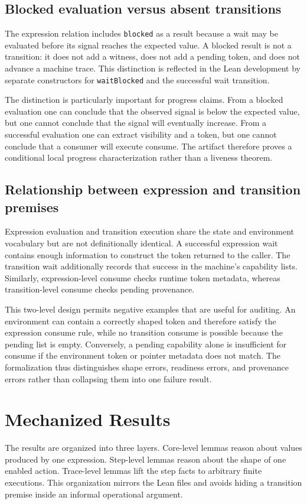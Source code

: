 \documentclass[a4paper,USenglish]{lipics-v2021}
\begin{document}
\subsection{Blocked evaluation versus absent transitions}
The expression relation includes \texttt{blocked} as a result because a wait
may be evaluated before its signal reaches the expected value. A blocked result
is not a transition: it does not add a witness, does not add a pending token,
and does not advance a machine trace. This distinction is reflected in the
Lean development by separate constructors for \texttt{waitBlocked} and the
successful wait transition.

The distinction is particularly important for progress claims. From a blocked
evaluation one can conclude that the observed signal is below the expected
value, but one cannot conclude that the signal will eventually increase. From
a successful evaluation one can extract visibility and a token, but one cannot
conclude that a consumer will execute consume. The artifact therefore proves a
conditional local progress characterization rather than a liveness theorem.

\subsection{Relationship between expression and transition premises}
Expression evaluation and transition execution share the state and environment
vocabulary but are not definitionally identical. A successful expression wait
contains enough information to construct the token returned to the caller. The
transition wait additionally records that success in the machine's capability
lists. Similarly, expression-level consume checks runtime token metadata,
whereas transition-level consume checks pending provenance.

This two-level design permits negative examples that are useful for auditing.
An environment can contain a correctly shaped token and therefore satisfy the
expression consume rule, while no transition consume is possible because the
pending list is empty. Conversely, a pending capability alone is insufficient
for consume if the environment token or pointer metadata does not match. The
formalization thus distinguishes shape errors, readiness errors, and provenance
errors rather than collapsing them into one failure result.

\section{Mechanized Results}
The results are organized into three layers. Core-level lemmas reason about
values produced by one expression. Step-level lemmas reason about the shape of
one enabled action. Trace-level lemmas lift the step facts to arbitrary finite
executions. This organization mirrors the Lean files and avoids hiding a
transition premise inside an informal operational argument.
\end{document}
